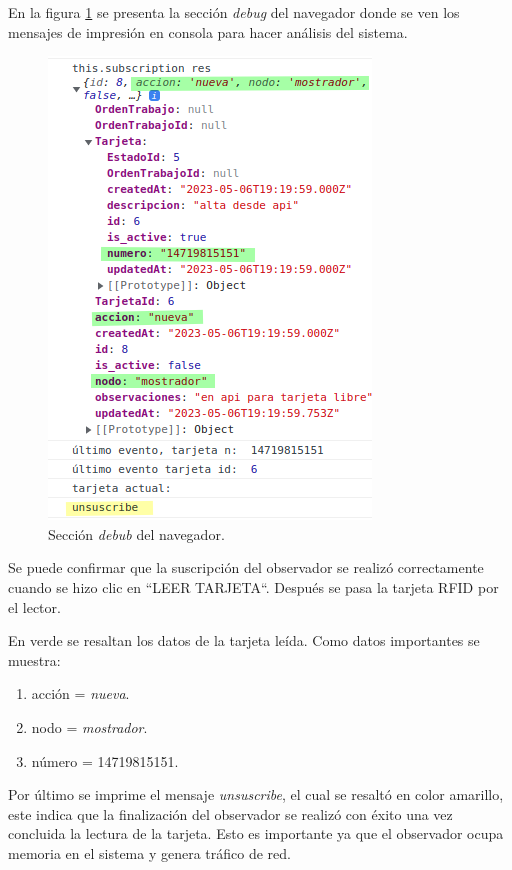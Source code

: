 En la figura \ref{fig:ensayonueva1-2} se presenta la sección \textit{debug} del navegador donde se ven los mensajes de impresión en consola para hacer análisis del sistema.

\begin{figure}[H]
	\centering
	\includegraphics[scale=.90]{./Figures/ensayo-1/5.nueva-2.png}
	\caption{Sección \textit{debub} del navegador.}
	\label{fig:ensayonueva1-2}
\end{figure}

Se puede confirmar que la suscripción del observador se realizó correctamente cuando se hizo clic en ``LEER TARJETA``. Después se pasa la tarjeta RFID por el lector. 

En verde se resaltan los datos de la tarjeta leída. Como datos importantes se muestra:

\begin{enumerate}
\item acción = \textit{nueva}.
\item nodo = \textit{mostrador}.
\item número = 14719815151.
\end{enumerate}

Por último se imprime el mensaje \textit{unsuscribe}, el cual se resaltó en color amarillo,  este indica que la finalización del observador se realizó con éxito una vez concluida la lectura de la tarjeta. Esto es importante ya que el observador ocupa memoria en el sistema y genera tráfico de red. 

